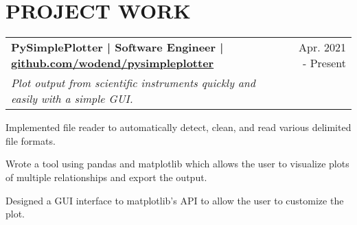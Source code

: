 \documentclass{article}
\makeatletter
\newcommand{\beginResumeList}{\begin{itemize}\setlength\itemsep{0em}\begin{minipage}{0.9\textwidth}}
\newcommand{\resumeListEnd}{\end{minipage}\end{itemize}}
\newcommand{\normalItem}[1]{\normalsize\item{#1}}
\newcommand{\project}[3]{
  \begin{tabular*}{\textwidth}[t]{l@{\extracolsep{\fill}}r}
    \normalsize\textbf{#1} & \normalsize{#2} \\
    \normalsize\textit{#3}
  \end{tabular*}
}
\makeatother
\begin{document}
\section{PROJECT WORK}


  \project
    {PySimplePlotter | Software Engineer | \href{https://github.com/wodend/pysimpleplotter}{github.com/wodend/pysimpleplotter}}
    {Apr. 2021 - Present}
    {Plot output from scientific instruments quickly and easily with a simple GUI.}
    \beginResumeList
      \normalItem{Implemented file reader to automatically detect, clean, and read various delimited file formats.}
      \normalItem{Wrote a tool using pandas and matplotlib which allows the user to visualize plots of multiple relationships and export the output.}
      \normalItem{Designed a GUI interface to matplotlib's API to allow the user to customize the plot.}
    \resumeListEnd

\end{document}
